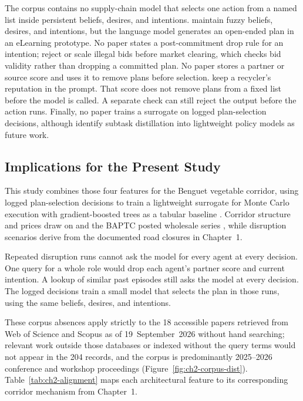 \documentclass{icsthesis}
\begin{document}
\begin{mainmatter}
			The corpus contains no supply-chain model that selects one action from a named list inside persistent beliefs, desires, and intentions. \citet{Asaf2025} maintain fuzzy beliefs, desires, and intentions, but the language model generates an open-ended plan in an eLearning prototype. No paper states a post-commitment drop rule for an intention; \citet{Zhou2026} reject or scale illegal bids before market clearing, which checks bid validity rather than dropping a committed plan. No paper stores a partner or source score and uses it to remove plans before selection. \citet{Kuo2026} keep a recycler's reputation in the prompt. That score does not remove plans from a fixed list before the model is called. A separate check can still reject the output before the action runs. Finally, no paper trains a surrogate on logged plan-selection decisions, although \citet{Zhou2026} identify subtask distillation into lightweight policy models as future work.

			\subsection{Implications for the Present Study}

			This study combines those four features for the Benguet vegetable corridor, using logged plan-selection decisions to train a lightweight surrogate for Monte Carlo execution with gradient-boosted trees as a tabular baseline \citep{Grinsztajn2022}. Corridor structure and prices draw on \citet{deGuzmanBambicoBaconguis2023} and the BAPTC posted wholesale series \citep{AgriTrakPH2025}, while disruption scenarios derive from the documented road closures in Chapter~1.

			Repeated disruption runs cannot ask the model for every agent at every decision. One query for a whole role would drop each agent's partner score and current intention. A lookup of similar past episodes still asks the model at every decision. The logged decisions train a small model that selects the plan in those runs, using the same beliefs, desires, and intentions.

			These corpus absences apply strictly to the 18 accessible papers retrieved from Web of Science and Scopus as of 19~September~2026 without hand searching; relevant work outside those databases or indexed without the query terms would not appear in the 204 records, and the corpus is predominantly 2025--2026 conference and workshop proceedings (Figure~\ref{fig:ch2-corpus-dist}). Table~\ref{tab:ch2-alignment} maps each architectural feature to its corresponding corridor mechanism from Chapter~1.


\end{mainmatter}
\end{document}
